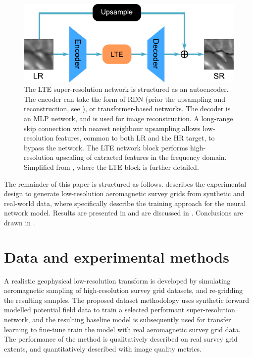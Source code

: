 \begin{figure}[hbtp]
    \centering
    \includegraphics[width=0.75\linewidth]{fig/p2/ltenet.pdf}
    \caption[The LTE architecture]{
        The LTE super-resolution network is structured as an autoencoder.
        The encoder can take the form of RDN (prior the upsampling and reconstruction, see ), or transformer-based networks.
        The decoder is an MLP network, and is used for image reconstruction.
        A long-range skip connection with nearest neighbour upsampling allows low-resolution features, common to both LR and the HR target, to bypass the network.
        The LTE network block performs high-resolution upscaling of extracted features in the frequency domain.
        Simplified from \textcite{leeLocalTextureEstimator2022}, where the LTE block is further detailed.
    }
    \label{fig:ltenet}
\end{figure}

The remainder of this paper is structured as follows.
 describes the experimental design to generate low-resolution aeromagnetic survey grids from synthetic and real-world data, where  specifically describe the training approach for the neural network model.
Results are presented in  and are discussed in .
Conclusions are drawn in .

\section{Data and experimental methods}
\label{sec:2methods}
A realistic geophysical low-resolution transform is developed by simulating aeromagnetic sampling of high-resolution survey grid datasets, and re-gridding the resulting samples.
The proposed dataset methodology uses synthetic forward modelled potential field data to train a selected performant super-resolution network, and the resulting baseline model is subsequently used for transfer learning to fine-tune train the model with real aeromagnetic survey grid data.
The performance of the method is qualitatively described on real survey grid extents, and quantitatively described with image quality metrics.

